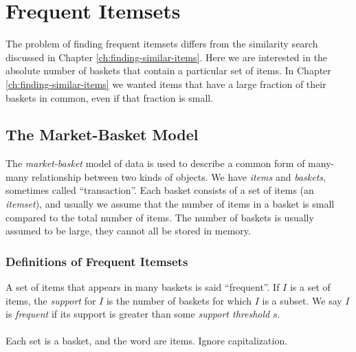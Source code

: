 \chapter{Frequent Itemsets}\label{ch:frequent-itemsets}

The problem of finding frequent itemsets differs from the similarity search discussed in Chapter \ref{ch:finding-similar-items}. Here we are interested in the absolute number of baskets that contain a particular set of items. In Chapter \ref{ch:finding-similar-items} we wanted items that have a large fraction of their baskets in common, even if that fraction is small.

\section{The Market-Basket Model}\label{sec:market-basket-model}

The \textit{market-basket} model of data is used to describe a common form of many-many relationship between two kinds of objects. We have \textit{items} and \textit{baskets}, sometimes called ``transaction''. Each basket consists of a set of items (an \textit{itemset}), and usually we assume that the number of items in a basket is small compared to the total number of items. The number of baskets is usually assumed to be large, they cannot all be stored in memory.

\subsection{Definitions of Frequent Itemsets}\label{subsec:definitions-of-frequent-itemsets}

A set of items that appears in many baskets is said ``frequent''. If $I$ is a set of items, the \textit{support} for $I$ is the number of baskets for which $I$ is a subset. We say $I$ is \textit{frequent} if its support is greater than some \textit{support threshold} $s$. 
\\
\\
Each set is a basket, and the word are items. Ignore capitalization.

